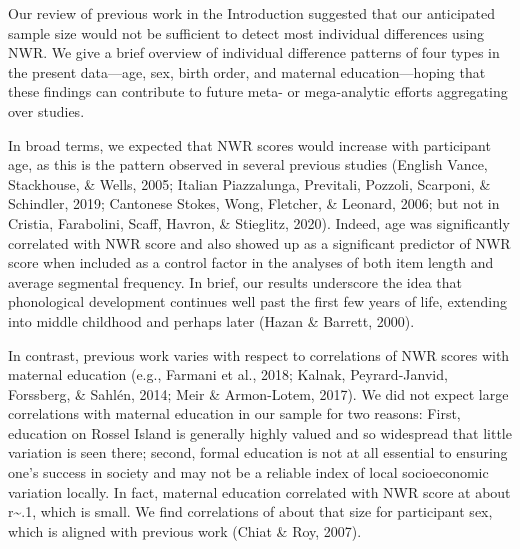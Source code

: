 \documentclass[
  english,
  ,man,floatsintext]{apa6}
\begin{document}
Our review of previous work in the Introduction suggested that our anticipated sample size would not be sufficient to detect most individual differences using NWR. We give a brief overview of individual difference patterns of four types in the present data---age, sex, birth order, and maternal education---hoping that these findings can contribute to future meta- or mega-analytic efforts aggregating over studies.

In broad terms, we expected that NWR scores would increase with participant age, as this is the pattern observed in several previous studies (English Vance, Stackhouse, \& Wells, 2005; Italian Piazzalunga, Previtali, Pozzoli, Scarponi, \& Schindler, 2019; Cantonese Stokes, Wong, Fletcher, \& Leonard, 2006; but not in Cristia, Farabolini, Scaff, Havron, \& Stieglitz, 2020). Indeed, age was significantly correlated with NWR score and also showed up as a significant predictor of NWR score when included as a control factor in the analyses of both item length and average segmental frequency. In brief, our results underscore the idea that phonological development continues well past the first few years of life, extending into middle childhood and perhaps later (Hazan \& Barrett, 2000).

In contrast, previous work varies with respect to correlations of NWR scores with maternal education (e.g., Farmani et al., 2018; Kalnak, Peyrard-Janvid, Forssberg, \& Sahlén, 2014; Meir \& Armon-Lotem, 2017). We did not expect large correlations with maternal education in our sample for two reasons: First, education on Rossel Island is generally highly valued and so widespread that little variation is seen there; second, formal education is not at all essential to ensuring one's success in society and may not be a reliable index of local socioeconomic variation locally. In fact, maternal education correlated with NWR score at about r\textasciitilde.1, which is small. We find correlations of about that size for participant sex, which is aligned with previous work (Chiat \& Roy, 2007).
\end{document}
